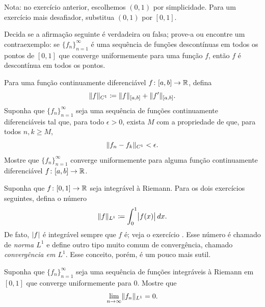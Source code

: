 \begin{exnote}
Nota: no exercício anterior, escolhemos $(0,1)$ por simplicidade. Para um
exercício mais desafiador, substitua $(0,1)$ por $[0,1]$.
\end{exnote}

\begin{exercise}
Decida se a afirmação seguinte é verdadeira ou falsa; prove-a ou encontre
um contraexemplo: se $\{ f_n \}_{n=1}^\infty$ é uma sequência de funções
descontínuas em todos os pontos de $[0,1]$ que converge uniformemente para
uma função $f$, então $f$ é descontínua em todos os pontos.
\end{exercise}

\begin{exercise} \label{c1uniflim:exercise}
Para uma função continuamente diferenciável $f \colon [a,b] \to {\mathbb{R}}$,
defina
\begin{equation*}
\lVert {f} \rVert_{C^1} \coloneqq \lVert {f} \rVert_{[a,b]} + \lVert {f'} \rVert_{[a,b]} .
\end{equation*}
Suponha que $\{ f_n \}_{n=1}^\infty$ seja uma sequência de funções
continuamente diferenciáveis tal que, para todo $\epsilon >0$, exista $M$
com a propriedade de que, para todos $n,k \geq M$,
\begin{equation*}
\lVert {f_n-f_k} \rVert_{C^1} < \epsilon .
\end{equation*}
Mostre que $\{ f_n \}_{n=1}^\infty$ converge uniformemente para alguma
função continuamente diferenciável $f \colon [a,b] \to {\mathbb{R}}$.
\end{exercise}

\begin{exnote}
Suponha que $f \colon [0,1] \to {\mathbb{R}}$ seja integrável à Riemann.
Para os dois exercícios seguintes, defina o número
\begin{equation*}
\lVert {f} \rVert_{L^1} \coloneqq 
\int_0^1 \bigl\lvert {f(x)} \bigr\rvert\,dx .
\end{equation*}
De fato, $\lvert {f} \rvert$ é integrável sempre que $f$ é; veja o exercício
.
Esse número é chamado de \emph{norma $L^1$} e
define outro tipo muito comum de convergência, chamado
\emph{convergência em $L^1$}.
Esse conceito, porém, é um pouco mais sutil.
\end{exnote}

\begin{exercise}
Suponha que $\{ f_n \}_{n=1}^\infty$ seja uma sequência de funções
integráveis à Riemann em $[0,1]$ que converge uniformemente para $0$.
Mostre que
\begin{equation*}
\lim_{n\to\infty} \lVert {f_n} \rVert_{L^1} = 0 .
\end{equation*}
\end{exercise}

